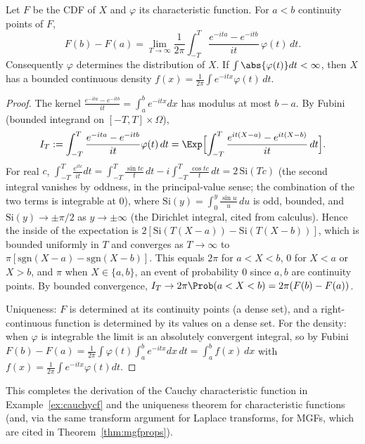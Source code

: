 \begin{theorem}\label{thm:inversion}
Let $F$ be the CDF of $X$ and $\varphi$ its characteristic function. For $a<b$ continuity
points of $F$,
\[
F(b)-F(a)=\lim_{T\to\infty}\frac1{2\pi}\int_{-T}^T\frac{e^{-ita}-e^{-itb}}{it}\,\varphi(t)\,dt .
\]
Consequently $\varphi$ determines the distribution of $X$. If $\int\abs{\varphi(t)}dt<\infty$,
then $X$ has a bounded continuous density $f(x)=\frac1{2\pi}\int e^{-itx}\varphi(t)\,dt$.
\end{theorem}
\begin{proof}
The kernel $\frac{e^{-ita}-e^{-itb}}{it}=\int_a^be^{-itx}dx$ has modulus at most $b-a$. By Fubini
(bounded integrand on $[-T,T]\times\Omega$),
\[
I_T:=\int_{-T}^T\frac{e^{-ita}-e^{-itb}}{it}\varphi(t)\,dt=\Exp\Bigl[\int_{-T}^T\frac{e^{it(X-a)}-e^{it(X-b)}}{it}\,dt\Bigr].
\]
For real $c$, $\int_{-T}^T\frac{e^{itc}}{it}dt=\int_{-T}^T\frac{\sin tc}t\,dt-i\int_{-T}^T\frac{\cos tc}t\,dt
=2\,\mathrm{Si}(Tc)$ (the second integral vanishes by oddness, in the principal-value
sense; the combination of the two terms is integrable at $0$), where
$\mathrm{Si}(y)=\int_0^y\frac{\sin u}u\,du$ is odd, bounded, and
$\mathrm{Si}(y)\to\pm\pi/2$ as $y\to\pm\infty$ (the Dirichlet integral, cited from
calculus). Hence the inside of the expectation is
$2[\mathrm{Si}(T(X-a))-\mathrm{Si}(T(X-b))]$, which is bounded uniformly in $T$ and converges
as $T\to\infty$ to $\pi[\mathrm{sgn}(X-a)-\mathrm{sgn}(X-b)]$. This equals $2\pi$ for
$a<X<b$, $0$ for $X<a$ or $X>b$, and $\pi$ when $X\in\{a,b\}$, an event of
probability $0$ since $a,b$ are continuity points. By bounded convergence,
$I_T\to2\pi\Prob(a<X<b)=2\pi(F(b)-F(a))$.

Uniqueness: $F$ is determined at its continuity points (a dense set), and a right-continuous
function is determined by its values on a dense set. For the density: when $\varphi$ is
integrable the limit is an absolutely convergent integral, so by Fubini
$F(b)-F(a)=\frac1{2\pi}\int\varphi(t)\int_a^be^{-itx}dx\,dt=\int_a^bf(x)\,dx$ with
$f(x)=\frac1{2\pi}\int e^{-itx}\varphi(t)dt$.
\end{proof}

This completes the derivation of the Cauchy characteristic function in
Example~\ref{ex:cauchycf} and the uniqueness theorem for characteristic functions (and, via
the same transform argument for Laplace transforms, for MGFs, which are cited in
Theorem~\ref{thm:mgfprops}).

